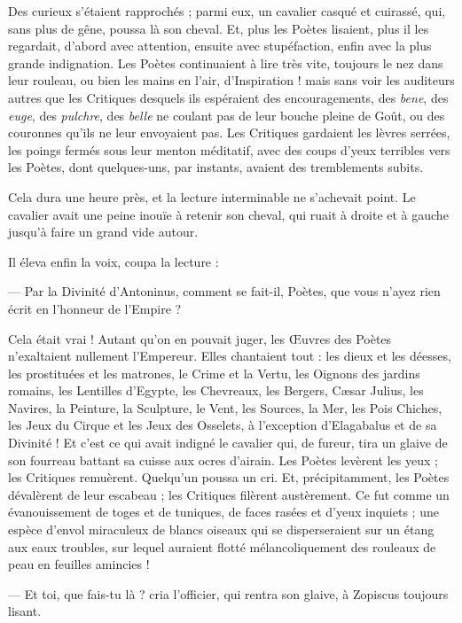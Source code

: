 \documentclass[a4paper, 11pt, oneside, polutonikogreek, french]{article}
\begin{document}
Des curieux s'étaient rapprochés ; parmi eux, un cavalier casqué et cuirassé, qui, sans plus de gêne, poussa là son cheval. Et, plus les Poètes lisaient, plus il les regardait, d'abord avec attention, ensuite avec stupéfaction, enfin avec la plus grande indignation. Les Poètes continuaient à lire très vite, toujours le nez dans leur rouleau, ou bien les mains en l'air, d'Inspiration ! mais sans voir les auditeurs autres que les Critiques desquels ils espéraient des encouragements, des \emph{bene}, des \emph{euge}, des \emph{pulchre}, des \emph{belle} ne coulant pas de leur bouche pleine de Goût, ou des couronnes qu'ils ne leur envoyaient pas. Les Critiques gardaient les lèvres serrées, les poings fermés sous leur menton méditatif, avec des coups d'yeux terribles vers les Poètes, dont quelques-uns, par instants, avaient des tremblements subits.

Cela dura une heure près, et la lecture interminable ne s'achevait point. Le cavalier avait une peine inouïe à retenir son cheval, qui ruait à droite et à gauche jusqu'à faire un grand vide autour.

Il éleva enfin la voix, coupa la lecture :

--- Par la Divinité d'Antoninus, comment se fait-il, Poètes, que vous n'ayez rien écrit en l'honneur de l'Empire ?

Cela était vrai ! Autant qu'on en pouvait juger, les Œuvres des Poètes n'exaltaient nullement l'Empereur. Elles chantaient tout : les dieux et les déesses, les prostituées et les matrones, le Crime et la Vertu, les Oignons des jardins romains, les Lentilles d'Egypte, les Chevreaux, les Bergers, Cæsar Julius, les Navires, la Peinture, la Sculpture, le Vent, les Sources, la Mer, les Pois Chiches, les Jeux du Cirque et les Jeux des Osselets, à l'exception d'Elagabalus et de sa Divinité ! Et c'est ce qui avait indigné le cavalier qui, de fureur, tira un glaive de son fourreau battant sa cuisse aux ocres d'airain. Les Poètes levèrent les yeux ; les Critiques remuèrent. Quelqu'un poussa un cri. Et, précipitamment, les Poètes dévalèrent de leur escabeau ; les Critiques filèrent austèrement. Ce fut comme un évanouissement de toges et de tuniques, de faces rasées et d'yeux inquiets ; une espèce d'envol miraculeux de blancs oiseaux qui se disperseraient sur un étang aux eaux troubles, sur lequel auraient flotté mélancoliquement des rouleaux de peau en feuilles amincies !

--- Et toi, que fais-tu là ? cria l'officier, qui rentra son glaive, à Zopiscus toujours lisant.
\end{document}
